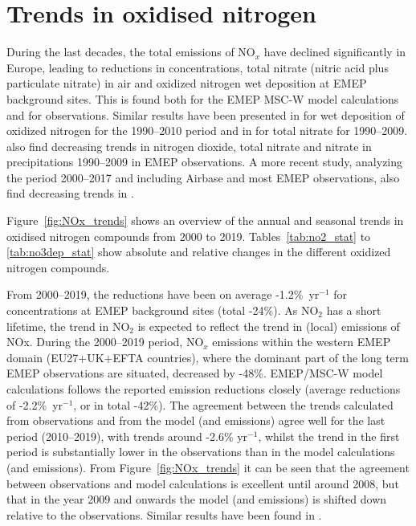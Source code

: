 \clearpage
\section{\label{sec:Trends_oxidised_nitrogen }Trends in oxidised nitrogen}

During the last decades, the total emissions of NO$_x$ have declined significantly in Europe, leading to reductions in  concentrations, total nitrate (nitric acid plus particulate nitrate) in air and oxidized nitrogen wet deposition at EMEP background sites. This is found both for the EMEP MSC-W model calculations and for observations. Similar results have been presented in \citet{Theobald2019} for wet deposition of oxidized nitrogen for the 1990--2010 period and in \citet{Banzhaf2015} for total nitrate for 1990--2009. \citet{torseth2012} also find decreasing trends in nitrogen dioxide, total nitrate and nitrate in precipitations 1990--2009 in EMEP observations. A more recent study, analyzing the period 2000--2017 \citep{Colette2021} and including Airbase and most EMEP observations, also find decreasing trends in .

Figure~\ref{fig:NOx_trends} shows an overview of the annual and seasonal trends in oxidised nitrogen compounds from 2000 to 2019. Tables~\ref{tab:no2_stat} to \ref{tab:no3dep_stat} show absolute and relative changes in the different oxidized nitrogen compounds.

From 2000--2019, the reductions have been on average -1.2\%~yr$^{-1}$ for  concentrations at EMEP background sites (total -24\%). As NO$_2$ has a short lifetime, the trend in NO$_2$ is expected to reflect the trend in (local) emissions of NOx. During the 2000--2019 period, NO$_x$ emissions within the western EMEP domain (EU27+UK+EFTA countries), where the dominant part of the long term EMEP observations are situated, decreased by -48\%. EMEP/MSC-W model calculations follows the reported emission reductions closely (average reductions of -2.2\%~yr$^{-1}$, or in total -42\%). 
The agreement between the trends calculated from observations and from the model (and emissions) agree well for the last period (2010--2019), with trends around -2.6\% yr$^{-1}$, whilst the trend in the first period is substantially lower in the observations than in the model calculations (and emissions). From Figure~\ref{fig:NOx_trends} it can be seen that the agreement between observations and model calculations is excellent until around 2008, but that in the year 2009 and onwards the model (and emissions) is shifted down relative to the observations. Similar results have been found in \citep{Colette2021}.

